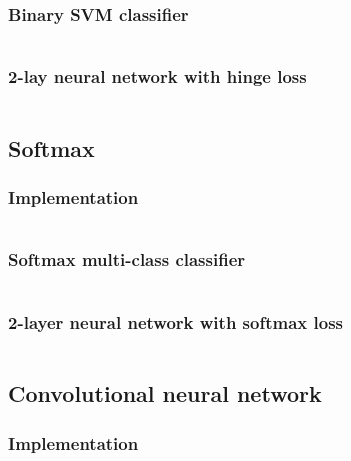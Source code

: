 \documentclass[12pt]{article}
\begin{document}
\newpage
\subsubsection{Binary SVM classifier}
\inputminted[frame=single,framesep=10pt,linenos, breaklines,xleftmargin=\parindent,xrightmargin=\parindent]{python}{./Homework1/code/svm1.out}

\newpage
\subsubsection{2-lay neural network with hinge loss}
\inputminted[frame=single,framesep=10pt,linenos, breaklines,xleftmargin=\parindent,xrightmargin=\parindent]{python}{./Homework1/code/svm2.out}

\newpage
\subsection{Softmax}
\subsubsection{Implementation}
\begin{scriptsize}
\inputminted[frame=single,framesep=10pt,linenos, breaklines,xleftmargin=\parindent,xrightmargin=\parindent]{python}{./Homework1/code/softmax.py}
\end{scriptsize}

\newpage
\subsubsection{Softmax multi-class classifier}
\inputminted[frame=single,framesep=10pt,linenos, breaklines,xleftmargin=\parindent,xrightmargin=\parindent]{python}{./Homework1/code/softmax1.out}

\newpage
\subsubsection{2-layer neural network with softmax loss}
\inputminted[frame=single,framesep=10pt,linenos, breaklines,xleftmargin=\parindent,xrightmargin=\parindent]{python}{./Homework1/code/softmax2.out}

\newpage
\subsection{Convolutional neural network}
\subsubsection{Implementation}
\begin{scriptsize}
\inputminted[frame=single,framesep=10pt,linenos, breaklines,xleftmargin=\parindent,xrightmargin=\parindent]{python}{./Homework1/code/cnn.py}
\end{scriptsize}
\end{document}
